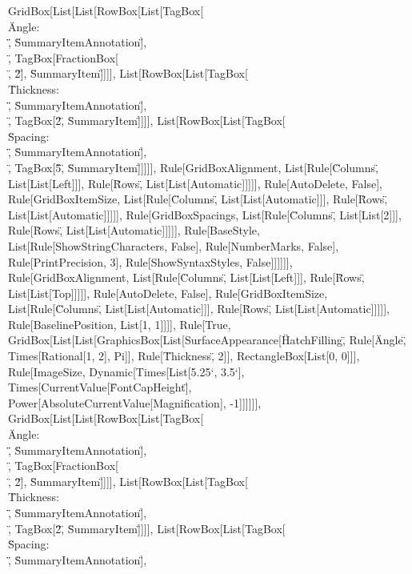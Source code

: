 \documentclass{article}
\begin{document}
{{{{GridBox[List[List[RowBox[List[TagBox[\"\\\"Angle: \\\"\", \"SummaryItemAnnotation\"], \"\\[InvisibleSpace]\", TagBox[FractionBox[\"\\[Pi]\", \"2\"],
\"SummaryItem\"]]]], List[RowBox[List[TagBox[\"\\\"Thickness: \\\"\", \"SummaryItemAnnotation\"], \"\\[InvisibleSpace]\", TagBox[\"2\", \"SummaryItem\"]]]],
List[RowBox[List[TagBox[\"\\\"Spacing: \\\"\", \"SummaryItemAnnotation\"], \"\\[InvisibleSpace]\", TagBox[\"5\", \"SummaryItem\"]]]]], Rule[GridBoxAlignment,
List[Rule[\"Columns\", List[List[Left]]], Rule[\"Rows\", List[List[Automatic]]]]], Rule[AutoDelete, False], Rule[GridBoxItemSize, List[Rule[\"Columns\",
List[List[Automatic]]], Rule[\"Rows\", List[List[Automatic]]]]], Rule[GridBoxSpacings, List[Rule[\"Columns\", List[List[2]]], Rule[\"Rows\", List[List[Automatic]]]]],
Rule[BaseStyle, List[Rule[ShowStringCharacters, False], Rule[NumberMarks, False], Rule[PrintPrecision, 3], Rule[ShowSyntaxStyles, False]]]]]], Rule[GridBoxAlignment,
List[Rule[\"Columns\", List[List[Left]]], Rule[\"Rows\", List[List[Top]]]]], Rule[AutoDelete, False], Rule[GridBoxItemSize, List[Rule[\"Columns\",
List[List[Automatic]]], Rule[\"Rows\", List[List[Automatic]]]]], Rule[BaselinePosition, List[1, 1]]]], Rule[True, GridBox[List[List[GraphicsBox[List[SurfaceAppearance[\"HatchFilling\",
Rule[\"Angle\", Times[Rational[1, 2], Pi]], Rule[\"Thickness\", 2]], RectangleBox[List[0, 0]]], Rule[ImageSize, Dynamic[Times[List[5.25`, 3.5`],
Times[CurrentValue[\"FontCapHeight\"], Power[AbsoluteCurrentValue[Magnification], -1]]]]]], GridBox[List[List[RowBox[List[TagBox[\"\\\"Angle: \\\"\",
\"SummaryItemAnnotation\"], \"\\[InvisibleSpace]\", TagBox[FractionBox[\"\\[Pi]\", \"2\"], \"SummaryItem\"]]]], List[RowBox[List[TagBox[\"\\\"Thickness:
\\\"\", \"SummaryItemAnnotation\"], \"\\[InvisibleSpace]\", TagBox[\"2\", \"SummaryItem\"]]]], List[RowBox[List[TagBox[\"\\\"Spacing: \\\"\", \"SummaryItemAnnotation\"],
}}}}
\end{document}
